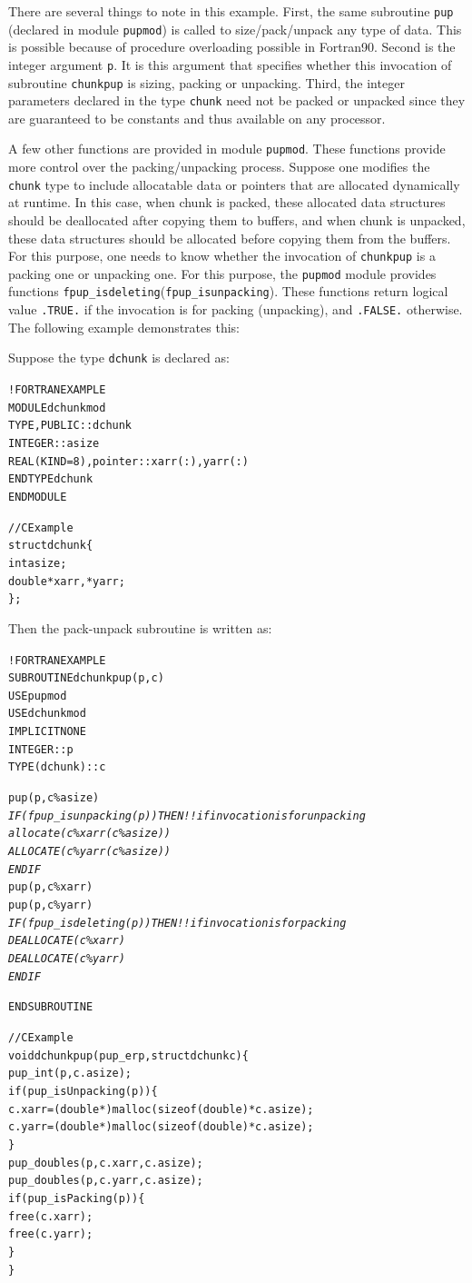 \documentclass[10pt]{article}
\begin{document}
There are several things to note in this example. First, the same subroutine
\texttt{pup} (declared in module \texttt{pupmod}) is called to size/pack/unpack
any type of data. This is possible because of procedure overloading possible in
Fortran90. Second is the integer argument \texttt{p}. It is this argument that
specifies whether this invocation of subroutine \texttt{chunkpup} is sizing,
packing or unpacking. Third, the integer parameters declared in the type
\texttt{chunk} need not be packed or unpacked since they are guaranteed to be
constants and thus available on any processor.

A few other functions are provided in module \texttt{pupmod}. These functions
provide more control over the packing/unpacking process. Suppose one modifies
the \texttt{chunk} type to include allocatable data or pointers that are
allocated dynamically at runtime. In this case, when chunk is packed, these
allocated data structures should be deallocated after copying them to buffers,
and when chunk is unpacked, these data structures should be allocated
before copying them from the buffers.  For this purpose, one needs to know
whether the invocation of \texttt{chunkpup} is a packing one or unpacking one.
For this purpose, the \texttt{pupmod} module provides functions
\verb+fpup_isdeleting+(\verb+fpup_isunpacking+). These functions return logical value
\verb+.TRUE.+ if the invocation is for packing (unpacking), and \verb+.FALSE.+
otherwise. The following example demonstrates this:

Suppose the type \texttt{dchunk} is declared as:

\begin{alltt}
!FORTRAN EXAMPLE
MODULE dchunkmod
  TYPE, PUBLIC :: dchunk
      INTEGER :: asize
      REAL(KIND=8), pointer :: xarr(:), yarr(:)
  END TYPE dchunk
END MODULE

//C Example
struct dchunk\{
  int asize;
  double* xarr, *yarr;
\};
\end{alltt}

Then the pack-unpack subroutine is written as:

\begin{alltt}
!FORTRAN EXAMPLE
SUBROUTINE dchunkpup(p, c)
  USE pupmod
  USE dchunkmod
  IMPLICIT NONE
  INTEGER :: p
  TYPE(dchunk) :: c

  pup(p, c\%asize)
  \emph{
  IF (fpup_isunpacking(p)) THEN       !! if invocation is for unpacking
    allocate(c\%xarr(c\%asize))
    ALLOCATE(c\%yarr(c\%asize))
  ENDIF
  }
  pup(p, c\%xarr)
  pup(p, c\%yarr)
  \emph{
  IF (fpup_isdeleting(p)) THEN        !! if invocation is for packing
    DEALLOCATE(c\%xarr)
    DEALLOCATE(c\%yarr)
  ENDIF
  }

END SUBROUTINE

//C Example
void dchunkpup(pup_er p, struct dchunk c)\{
  pup_int(p,c.asize);
  if(pup_isUnpacking(p))\{
    c.xarr = (double *)malloc(sizeof(double)*c.asize);
    c.yarr = (double *)malloc(sizeof(double)*c.asize);
  \}
  pup_doubles(p,c.xarr,c.asize);
  pup_doubles(p,c.yarr,c.asize);
  if(pup_isPacking(p))\{
    free(c.xarr);
    free(c.yarr);
  \}
\}
\end{alltt}
\end{document}
